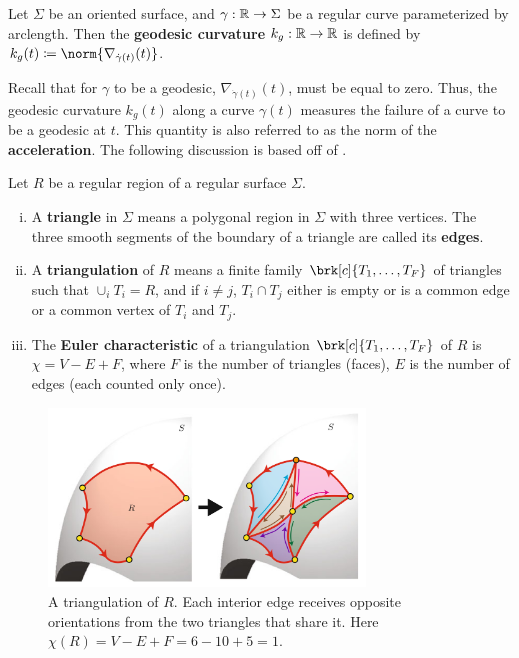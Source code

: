 \begin{definition}[]\label{}
Let $\Sigma$ be an oriented surface, and $\gamma: \mathbb{R} \to \Sigma$ be a regular curve parameterized by arclength. Then the \textbf{geodesic curvature} $k_g:\mathbb{R} \to \mathbb{R}$ is defined by $k_g(t) \defn \norm{\nabla_{\dot{\gamma}(t)}(t)}$.
\end{definition}
Recall that for $\gamma$ to be a geodesic, $\nabla_{\dot{\gamma}(t)}(t)$, must be equal to zero. Thus, the geodesic curvature $k_g(t)$ along a curve $\gamma(t)$ measures the failure of a curve to be a geodesic at $t$. This quantity is also referred to as the norm of the \textbf{acceleration}.
%
The following discussion is based off of \cite{tapp2016differential}.
\begin{definition}[]\label{}
Let $R$ be a regular region of a regular surface $\Sigma$.
\begin{enumerate}[i)]
\item A \textbf{triangle} in $\Sigma$ means a polygonal region in $\Sigma$ with three vertices. The three smooth segments of the boundary of a triangle are called its \textbf{edges}.
\item A \textbf{triangulation} of $R$ means a finite family $\brk[c]{T_1, \ldots, T_F}$ of triangles such that $\cup_i T_i = R$, and if $i \neq j$, $T_i \cap T_j$ either is empty or is a common edge or a common vertex of $T_i$ and $T_j$.
\item The \textbf{Euler characteristic} of a triangulation $\brk[c]{T_1, \ldots, T_F}$ of $R$ is $\chi = V - E + F$, where $F$ is the number of triangles (faces), $E$ is the number of edges (each counted only once).
\end{enumerate}
\end{definition}
\begin{figure}[!htb]
	\centering
	\includegraphics[width=0.75\textwidth]{img/triangulation.png}
	\caption{A triangulation of $R$. Each interior edge receives opposite orientations from the two triangles that share it. Here $\chi(R) = V - E + F = 6 - 10 + 5 = 1$.}
	\label{}
\end{figure}

